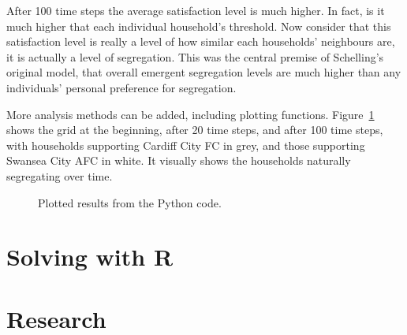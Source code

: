 After 100 time steps the average satisfaction level is much higher.
In fact, is it much higher that each individual household's threshold.
Now consider that this satisfaction level is really a level of how similar
each households' neighbours are, it is actually a level of segregation.
This was the central premise of Schelling's original model, that overall
emergent segregation levels are much higher than any individuals' personal
preference for segregation.

More analysis methods can be added, including plotting functions.
Figure~\ref{fig:schelling_python_plot} shows the grid at the beginning, after 20
time steps, and after 100 time steps, with households supporting Cardiff City FC
in grey, and those supporting Swansea City AFC in white.
It visually shows the households naturally segregating over time.

\begin{figure}
\begin{center}
\end{center}
\caption{Plotted results from the Python code.}
\label{fig:schelling_python_plot}
\end{figure}

\section{Solving with R}\label{sec:solving-with-R}

\section{Research}\label{sec:research}
